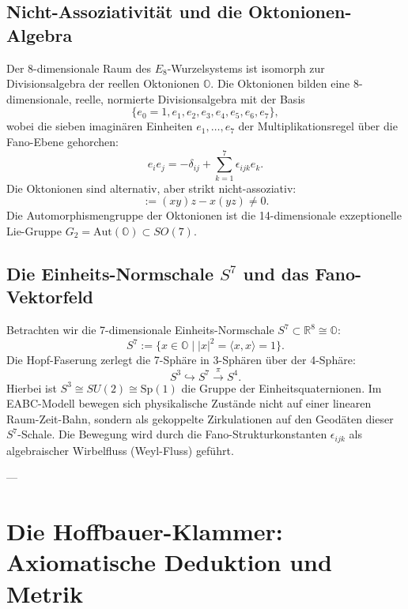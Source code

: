 \documentclass[11pt,a4paper]{article}
\theoremstyle{definition}
\theoremstyle{remark}
\numberwithin{equation}{section}
\begin{document}
\subsection{Nicht-Assoziativität und die Oktonionen-Algebra}

Der 8-dimensionale Raum des $E_8$-Wurzelsystems ist isomorph zur Divisionsalgebra der reellen Oktonionen $\mathbb{O}$. Die Oktonionen bilden eine 8-dimensionale, reelle, normierte Divisionsalgebra mit der Basis
\begin{equation}
\{e_0 = 1, e_1, e_2, e_3, e_4, e_5, e_6, e_7\},
\end{equation}
wobei die sieben imaginären Einheiten $e_1, \dots, e_7$ der Multiplikationsregel über die Fano-Ebene gehorchen:
\begin{equation}
e_i e_j = -\delta_{ij} + \sum_{k=1}^7 \epsilon_{ijk} e_k.
\end{equation}
Die Oktonionen sind alternativ, aber strikt nicht-assoziativ:
\begin{equation}
[x, y, z] := (xy)z - x(yz) \neq 0.
\end{equation}
Die Automorphismengruppe der Oktonionen ist die 14-dimensionale exzeptionelle Lie-Gruppe $G_2 = \mathrm{Aut}(\mathbb{O}) \subset SO(7)$.

\subsection{Die Einheits-Normschale $S^7$ und das Fano-Vektorfeld}

Betrachten wir die 7-dimensionale Einheits-Normschale $S^7 \subset \mathbb{R}^8 \cong \mathbb{O}$:
\begin{equation}
S^7 := \{ x \in \mathbb{O} \mid |x|^2 = \langle x, x \rangle = 1 \}.
\end{equation}
Die Hopf-Faserung zerlegt die 7-Sphäre in 3-Sphären über der 4-Sphäre:
\begin{equation}
S^3 \hookrightarrow S^7 \xrightarrow{\pi} S^4.
\end{equation}
Hierbei ist $S^3 \cong SU(2) \cong \mathrm{Sp}(1)$ die Gruppe der Einheitsquaternionen. 
Im EABC-Modell bewegen sich physikalische Zustände nicht auf einer linearen Raum-Zeit-Bahn, sondern als gekoppelte Zirkulationen auf den Geodäten dieser $S^7$-Schale. Die Bewegung wird durch die Fano-Strukturkonstanten $\epsilon_{ijk}$ als algebraischer Wirbelfluss (Weyl-Fluss) geführt.

---

\section{Die Hoffbauer-Klammer: Axiomatische Deduktion und Metrik}
\end{document}

